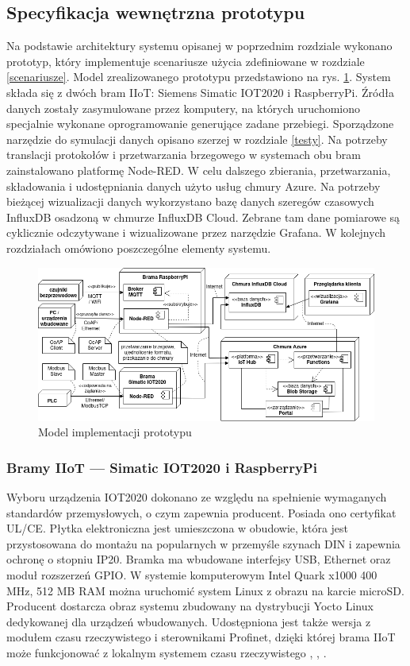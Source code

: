 \documentclass[a4paper, 12pt, twoside]{article}
\begin{document}
\subsection{Specyfikacja wewnętrzna prototypu}

Na podstawie architektury systemu opisanej w poprzednim rozdziale wykonano
prototyp, który implementuje scenariusze użycia zdefiniowane w rozdziale \ref{scenariusze}.
Model zrealizowanego prototypu przedstawiono na rys. \ref{fig:impl}.
System składa się z dwóch bram IIoT: Siemens Simatic IOT2020 i RaspberryPi.
Źródła danych
zostały zasymulowane przez komputery, na których uruchomiono specjalnie wykonane oprogramowanie
generujące zadane przebiegi. Sporządzone narzędzie do symulacji danych opisano szerzej w rozdziale
\ref{testy}. Na potrzeby translacji protokołów
i przetwarzania brzegowego w systemach obu bram zainstalowano platformę Node-RED.
W celu dalszego zbierania, przetwarzania, składowania i udostępniania danych
użyto usług chmury Azure. Na potrzeby bieżącej wizualizacji danych wykorzystano
bazę danych szeregów czasowych InfluxDB osadzoną w chmurze InfluxDB Cloud.
Zebrane tam dane pomiarowe są cyklicznie odczytywane i wizualizowane przez narzędzie Grafana.
W kolejnych rozdziałach omówiono poszczególne elementy systemu.

\begin{figure}[h]
      \centering
      \includegraphics[width=\textwidth]{impl.png}
      \caption{Model implementacji prototypu}
      \label{fig:impl}
\end{figure}

\subsubsection{Bramy IIoT --- Simatic IOT2020 i RaspberryPi}

Wyboru urządzenia IOT2020 dokonano ze względu na spełnienie wymaganych standardów przemysłowych,
o czym zapewnia producent. Posiada ono certyfikat UL/CE. Płytka elektroniczna
jest umieszczona w obudowie, która jest przystosowana do montażu
na popularnych w przemyśle szynach DIN i zapewnia ochronę o stopniu IP20. Bramka
ma wbudowane interfejsy USB, Ethernet oraz moduł rozszerzeń GPIO. W systemie
komputerowym Intel Quark x1000 400 MHz, 512 MB RAM można uruchomić system
Linux z obrazu na karcie microSD. Producent dostarcza obraz systemu zbudowany
na dystrybucji Yocto Linux dedykowanej dla urządzeń wbudowanych. Udostępniona
jest także wersja z modułem czasu rzeczywistego i sterownikami Profinet,
dzięki której brama IIoT może funkcjonować z lokalnym systemem czasu rzeczywistego
\cite{simatic-iot-sepc}, \cite{simatic-iot-profinet}, \cite{modbus-iot-gateway}.
\end{document}
